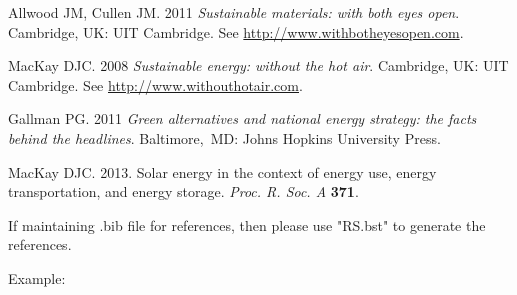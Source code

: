 \documentclass[]{rsos}%
\begin{document}
\begin{thebibliography}{9}

 Allwood JM, Cullen JM. 2011 \textit{Sustainable materials:  with both eyes open}.
Cambridge, UK: UIT Cambridge. See \href{http://www.withbotheyesopen.com}{http://www.withbotheyesopen.com}.

  MacKay DJC. 2008  \textit{Sustainable energy:  without the hot air}.
 Cambridge, UK: UIT Cambridge. See \href{http://www.withouthotair.com}{http://www.withouthotair.com}.

 Gallman PG. 2011  \textit{Green alternatives and national energy strategy: the facts
 behind the headlines}.  Baltimore,\ MD: Johns Hopkins University Press.

 MacKay DJC. 2013.  Solar energy in the context of energy use, energy transportation, and
 energy storage. \textit{Proc. R. Soc. A} \textbf{371}.

\end{thebibliography}

\vskip2pc

\noindent If maintaining .bib file for references, then please use "RS.bst" to generate the references.

\noindent Example:

\verb++ %

\verb++ %
\end{document}
